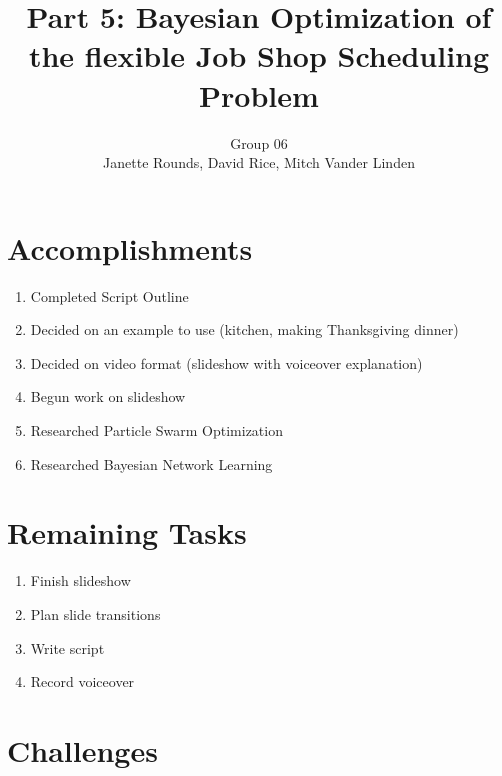 \documentclass[11pt,twocolumn]{article}
\title{Part 5: Bayesian Optimization of the flexible Job Shop Scheduling Problem}
\author{Group 06 \\ 
\small Janette Rounds, \small David Rice, \small Mitch Vander Linden}
\begin{document}
	\section{Accomplishments}
	\begin{enumerate}
		\item Completed Script Outline
		\item Decided on an example to use (kitchen, making Thanksgiving dinner)
		\item Decided on video format (slideshow with voiceover explanation)
		\item Begun work on slideshow
		\item Researched Particle Swarm Optimization
		\item Researched Bayesian Network Learning
	\end{enumerate}
	\section{Remaining Tasks}
	\begin{enumerate}
		\item Finish slideshow
		\item Plan slide transitions
		\item Write script
		\item Record voiceover
	\end{enumerate}
	\section{Challenges}
\end{document}

